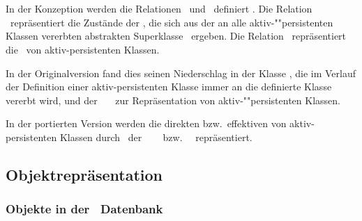 \subsection{\protect\Spc\ \protect\mc[n]}
%
In der Konzeption werden die Relationen \ und
\ definiert \cite[]{bib:ro87}. Die
Relation \ repr\"{a}sentiert die Zust\"{a}nde der \Slt[s],
die sich aus der an alle ak\-tiv-""per\-si\-sten\-ten Klassen
vererbten abstrakten Superklasse \ ergeben. Die
Relation \ re\-pr\"{a}\-sen\-tiert die \clsmo[e]\ von
aktiv-persistenten Klassen.
%
\par{}In der Originalversion fand dies seinen Niederschlag in der
Klasse , die im Verlauf der Definition einer
aktiv-persistenten Klasse immer an die definierte Klasse vererbt
wird, und der \spc[n]\ \clsmc\ \ zur Repr\"{a}sentation
von ak\-tiv-""per\-si\-sten\-ten Klassen.
%
\par{}In der portierten Version werden die direkten bzw.\ effektiven
\Slt[s]\/ von aktiv-persistenten Klassen durch
\sltmo[e]\ der \spc[n]\ \sltmc[n]\ %
%
\ bzw.\ %
%
\ repr\"{a}sentiert.
%
\subsection{Objektrepr\"{a}sentation}
%
%
\subsubsection{Objekte in der \protect\postgres\ Datenbank}
%
